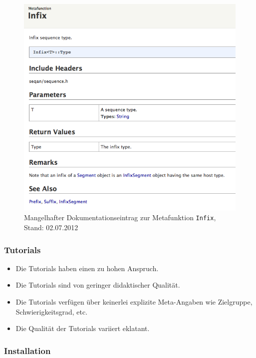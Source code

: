 \begin{figure}
  \centering
    \includegraphics[width=0.95\linewidth]{Figures/dox/infix-old.png}
  \caption[Mangelhafter Dokumentationseintrag]{Mangelhafter Dokumentationseintrag zur Metafunktion \texttt{Infix},\\Stand: 02.07.2012}
  \label{fig:dox-index-old}
\end{figure}


\subsubsection{Tutorials}

\begin{itemize}
  \item Die Tutorials haben einen zu hohen Anspruch.
  \item Die Tutorials sind von geringer didaktischer Qualität.
  \item Die Tutorials verfügen über keinerlei explizite Meta-Angaben wie Zielgruppe, Schwierigkeitsgrad, etc.
  \item Die Qualität der Tutorials variiert eklatant.
\end{itemize}



\subsubsection{Installation}

